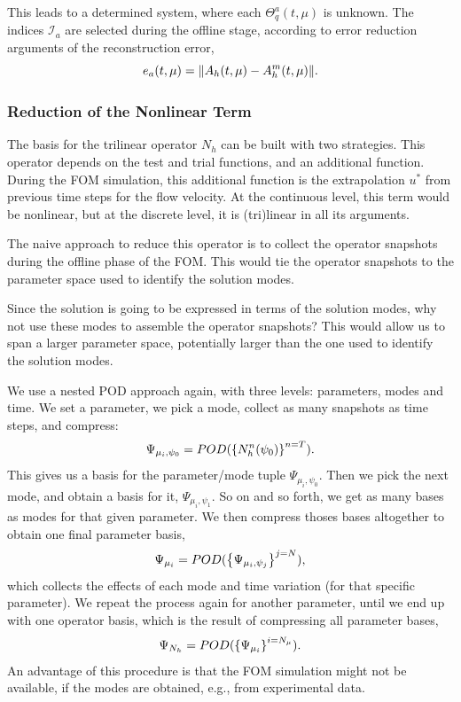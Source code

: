 \documentclass[../../thesis.tex]{subfiles}
\begin{document}
This leads to a determined system, where each $\Theta_q^a(t, \mu)$ is unknown.
The indices $\mathcal{I}_a$ are selected during the offline stage, 
according to error reduction arguments of the reconstruction error,
\begin{equation}
    e_a(t, \mu) = \norm{A_h(t, \mu) - A_h^m(t, \mu)}.
\end{equation}

\subsubsection{Reduction of the Nonlinear Term}
The basis for the trilinear operator $N_h$ can be built with two strategies.
This operator depends on the test and trial functions,
and an additional function.
During the FOM simulation,
this additional function is the extrapolation $u^{*}$ from previous time steps
for the flow velocity. 
At the continuous level, this term would be nonlinear,
but at the discrete level, it is (tri)linear in all its arguments.

The naive approach to reduce this operator is to collect 
the operator snapshots during the offline phase of the FOM.
This would tie the operator snapshots to the parameter space
used to identify the solution modes.

Since the solution is going to be expressed in terms of the solution modes,
why not use these modes to assemble the operator snapshots?
This would allow us to span a larger parameter space,
potentially larger than the one used to identify the solution modes. 

We use a nested POD approach again, with three levels: 
parameters, modes and time.
We set a parameter, we pick a mode, collect as many snapshots
as time steps, and compress:
\begin{equation}
    \Psi_{\mu_i, \psi_0} = POD(\qty{N^{n}_h(\psi_0)}^{n=T}).
\end{equation}
This gives us a basis for the parameter/mode tuple $\Psi_{\mu_i, \psi_0}$. 
Then we pick the next mode, and obtain a basis for it, $\Psi_{\mu_i, \psi_1}$.
So on and so forth, we get as many bases as modes for that given parameter.
We then compress thoses bases altogether to obtain one final parameter basis,
\begin{equation}
    \Psi_{\mu_i} = POD(\qty{\Psi_{\mu_i, \psi_j}}^{j=N}),
\end{equation}
which collects the effects of each mode and time variation (for that specific parameter).
We repeat the process again for another parameter, 
until we end up with one operator basis,
which is the result of compressing all parameter bases,
\begin{equation}
    \Psi_{N_h} = POD(\qty{\Psi_{\mu_i}}^{i=N_{\mu}}).
\end{equation}
An advantage of this procedure is that the FOM simulation 
might not be available, 
if the modes are obtained, e.g., from experimental data.
\end{document}
